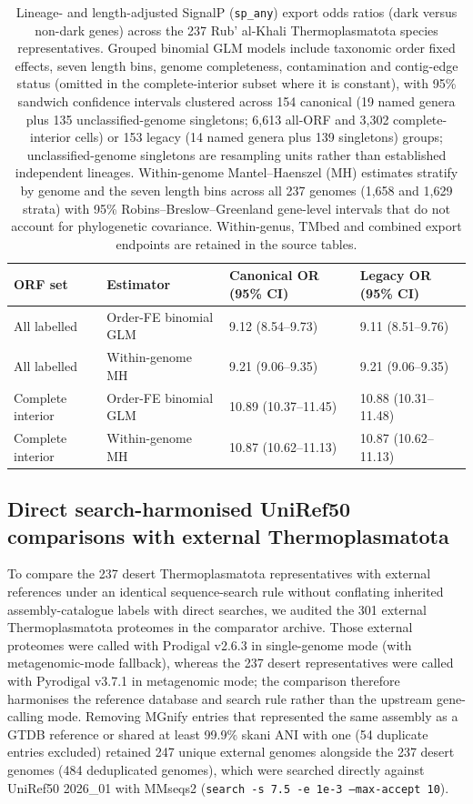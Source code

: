 \begin{table}[ht]\centering\footnotesize
\caption{Lineage- and length-adjusted SignalP (\texttt{sp\_any}) export odds ratios (dark versus non-dark genes) across the 237 Rub' al-Khali Thermoplasmatota species representatives. Grouped binomial GLM models include taxonomic order fixed effects, seven length bins, genome completeness, contamination and contig-edge status (omitted in the complete-interior subset where it is constant), with 95\% sandwich confidence intervals clustered across 154 canonical (19 named genera plus 135 unclassified-genome singletons; 6,613 all-ORF and 3,302 complete-interior cells) or 153 legacy (14 named genera plus 139 singletons) groups; unclassified-genome singletons are resampling units rather than established independent lineages. Within-genome Mantel--Haenszel (MH) estimates stratify by genome and the seven length bins across all 237 genomes (1,658 and 1,629 strata) with 95\% Robins--Breslow--Greenland gene-level intervals that do not account for phylogenetic covariance. Within-genus, TMbed and combined export endpoints are retained in the source tables.}\label{tab:export_adj_completed}
\begin{tabular}{@{}llll@{}}
\toprule
ORF set & Estimator & Canonical OR (95\% CI) & Legacy OR (95\% CI)\\
\midrule
All labelled & Order-FE binomial GLM & 9.12 (8.54--9.73) & 9.11 (8.51--9.76)\\
All labelled & Within-genome MH & 9.21 (9.06--9.35) & 9.21 (9.06--9.35)\\
Complete interior & Order-FE binomial GLM & 10.89 (10.37--11.45) & 10.88 (10.31--11.48)\\
Complete interior & Within-genome MH & 10.87 (10.62--11.13) & 10.87 (10.62--11.13)\\
\bottomrule
\end{tabular}
\end{table}

\subsection*{Direct search-harmonised UniRef50 comparisons with external Thermoplasmatota}
To compare the 237 desert Thermoplasmatota representatives with external references under an identical sequence-search rule without conflating inherited assembly-catalogue labels with direct searches, we audited the 301 external Thermoplasmatota proteomes in the comparator archive. Those external proteomes were called with Prodigal v2.6.3 in single-genome mode (with metagenomic-mode fallback), whereas the 237 desert representatives were called with Pyrodigal v3.7.1 in metagenomic mode; the comparison therefore harmonises the reference database and search rule rather than the upstream gene-calling mode. Removing MGnify entries that represented the same assembly as a GTDB reference or shared at least 99.9\% skani ANI with one (54 duplicate entries excluded) retained 247 unique external genomes alongside the 237 desert genomes (484 deduplicated genomes), which were searched directly against UniRef50 2026\_01 with MMseqs2 (\texttt{search -s 7.5 -e 1e-3 --max-accept 10}).

